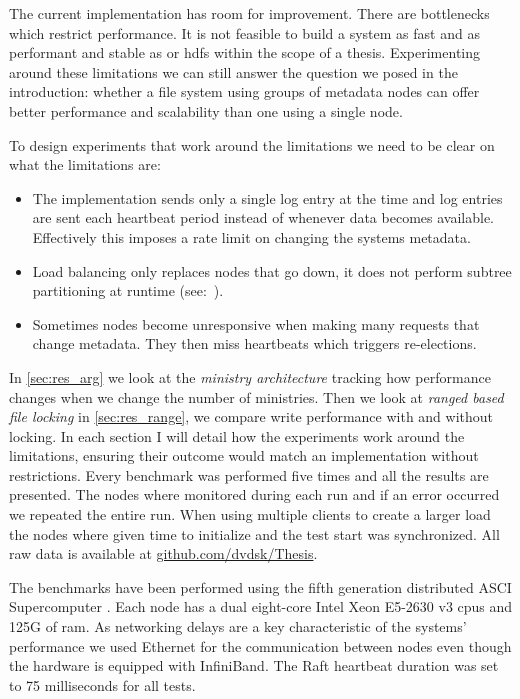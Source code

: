 The current implementation has room for improvement. There are bottlenecks which restrict performance. It is not feasible to build a system as fast and as performant and stable as \ceph{} or \ac{hdfs} within the scope of a thesis. Experimenting around these limitations we can still answer the question we posed in the introduction: whether a file system using groups of metadata nodes can offer better performance and scalability than one using a single node.

To design experiments that work around the limitations we need to be clear on what the limitations are:

\begin{itemize}
	\item The \raft{} implementation sends only a single log entry at the time and log entries are sent each heartbeat period instead of whenever data becomes available. Effectively this imposes a rate limit on changing the systems metadata.
	\item Load balancing only replaces nodes that go down, it does not perform subtree partitioning at runtime (see:~).
	\item Sometimes nodes become unresponsive when making many requests that change metadata. They then miss heartbeats which triggers re-elections.
\end{itemize}

In \cref{sec:res_arg} we look at the \textit{ministry architecture} tracking how performance changes when we change the number of ministries. Then we look at \textit{ranged based file locking} in \cref{sec:res_range}, we compare write performance with and without locking. In each section I will detail how the experiments work around the limitations, ensuring their outcome would match an implementation without restrictions. Every benchmark was performed five times and all the results are presented. The nodes where monitored during each run and if an error occurred we repeated the entire run. When using multiple clients to create a larger load the nodes where given time to initialize and the test start was synchronized. All raw data is available at \href{https://github.com/dvdsk/Thesis}{github.com/dvdsk/Thesis}.

The benchmarks have been performed using the fifth generation distributed ASCI Supercomputer \cite{das5}. Each node has a dual eight-core Intel Xeon E5-2630 v3 cpus and 125G of ram. As networking delays are a key characteristic of the systems' performance we used Ethernet for the communication between nodes even though the hardware is equipped with InfiniBand. The Raft heartbeat duration was set to 75 milliseconds for all tests.

